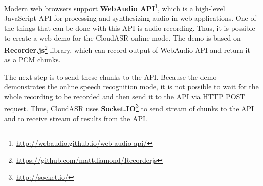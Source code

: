 Modern web browsers support \textbf{WebAudio API}\footnote{\url{http://webaudio.github.io/web-audio-api/}},
  which is a high-level JavaScript API for processing and synthesizing audio in web applications.
One of the things that can be done with this API is audio recording.
Thus, it is possible to create a web demo for the CloudASR online mode.
The demo is based on \textbf{Recorder.js}\footnote{\url{https://github.com/mattdiamond/Recorderjs}} library,
  which can record output of WebAudio API and return it as a PCM chunks.

The next step is to send these chunks to the API.
Because the demo demonstrates the online speech recognition mode,
  it is not possible to wait for the whole recording to be recorded and then send it to the API via HTTP POST request.
Thus, CloudASR uses \textbf{Socket.IO}\footnote{\url{http://socket.io/}} to send stream of chunks to the API
  and to receive stream of results from the API.
